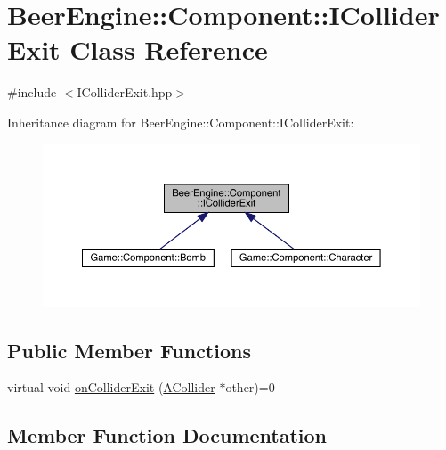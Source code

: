 \hypertarget{class_beer_engine_1_1_component_1_1_i_collider_exit}{}\section{Beer\+Engine\+:\+:Component\+:\+:I\+Collider\+Exit Class Reference}
\label{class_beer_engine_1_1_component_1_1_i_collider_exit}


{\ttfamily \#include $<$I\+Collider\+Exit.\+hpp$>$}



Inheritance diagram for Beer\+Engine\+:\+:Component\+:\+:I\+Collider\+Exit\+:
\nopagebreak
\begin{figure}[H]
\begin{center}
\leavevmode
\includegraphics[width=350pt]{class_beer_engine_1_1_component_1_1_i_collider_exit__inherit__graph}
\end{center}
\end{figure}
\subsection*{Public Member Functions}
\begin{DoxyCompactItemize}
\item 
virtual void \mbox{\hyperlink{class_beer_engine_1_1_component_1_1_i_collider_exit_a3669477d0003535fbe0411449efc69e9}{on\+Collider\+Exit}} (\mbox{\hyperlink{class_beer_engine_1_1_component_1_1_a_collider}{A\+Collider}} $\ast$other)=0
\end{DoxyCompactItemize}


\subsection{Member Function Documentation}
\mbox{\label{class_beer_engine_1_1_component_1_1_i_collider_exit_a3669477d0003535fbe0411449efc69e9}} 
